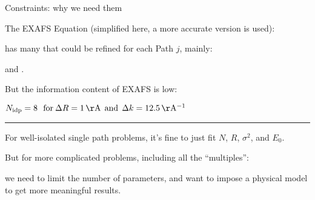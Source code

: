 \begin{slide}{Constraints: why we need them}
    
    The EXAFS Equation (simplified here, a more accurate version is used):

    \begin{center}
    \end{center}

    
    \vmm has many {} that could be refined 
    for each Path $j$, mainly:

    \begin{center} 

      {} and {}.
      
    \end{center}
    
    
    \vmm 
    
    But the information content of EXAFS is low:
    \begin{center} $ N_{\rm idp} = 8 \> \> \> 
      {\rm for} \> \Delta R = 1 \, {\rm \AA} \>\> {\rm and} \>\> \Delta k = 12.5\,
    {\rm \AA^{-1} } $ \end{center}
    
  
    \vmm \hrule \vmm

    For well-isolated single path problems, it's fine to just fit $N$, $R$,
    $\sigma^2$, and $E_0$.
    
    \vmm 
    
    But for more complicated problems, including all the ``multiples'':

    \vmm

    {}

    \vmm
    
    we need to limit the number of parameters, and want to impose a
    physical model to get more meaningful results.

\vfill
\end{slide} 


